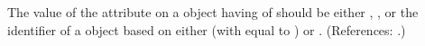 The value of the attribute  on a \Compartment object having
 of  should be either
, , or the identifier of a \UnitDefinition
object based on either  (with  equal to
) or .  (References: .)
